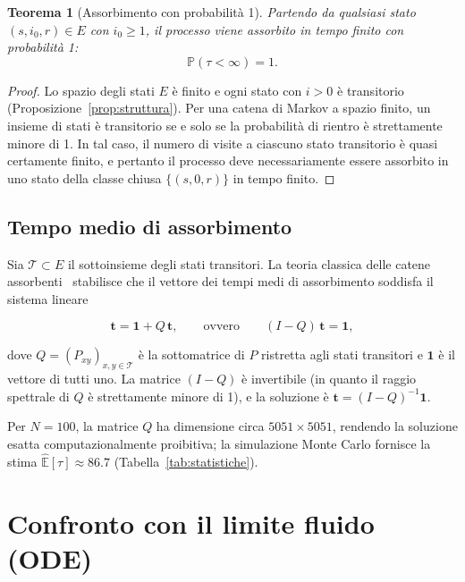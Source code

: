 \documentclass[11pt, a4paper]{article}
\theoremstyle{plain}
\newtheorem{theorem}{Teorema}[section]
\theoremstyle{definition}
\theoremstyle{remark}
\newcommand{\E}{\mathbb{E}}
\newcommand{\Prob}{\mathbb{P}}
\newcommand{\uno}{\mathbf{1}}
\begin{document}
\begin{theorem}[Assorbimento con probabilità 1]\label{thm:assorbimento}
  Partendo da qualsiasi stato $(s, i_0, r) \in E$ con $i_0 \geq 1$, il processo
  viene assorbito in tempo finito con probabilità 1:
  \[
    \Prob(\tau < \infty) = 1.
  \]
\end{theorem}

\begin{proof}
  Lo spazio degli stati $E$ è finito e ogni stato con $i > 0$ è transitorio
  (Proposizione~\ref{prop:struttura}). Per una catena di Markov a spazio finito,
  un insieme di stati è transitorio se e solo se la probabilità di rientro è
  strettamente minore di 1. In tal caso, il numero di visite a ciascuno stato
  transitorio è quasi certamente finito, e pertanto il processo deve necessariamente
  essere assorbito in uno stato della classe chiusa $\{(s,0,r)\}$ in tempo finito.
\end{proof}

\subsection{Tempo medio di assorbimento}

Sia $\mathcal{T} \subset E$ il sottoinsieme degli stati transitori. La teoria classica
delle catene assorbenti~\cite{norris1997} stabilisce che il vettore dei tempi medi di
assorbimento soddisfa il sistema lineare

\begin{equation}\label{eq:tempo_medio}
  \mathbf{t} = \uno + Q\,\mathbf{t},
  \qquad \text{ovvero} \qquad
  (I - Q)\,\mathbf{t} = \uno,
\end{equation}

dove $Q = (P_{xy})_{x,y \in \mathcal{T}}$ è la sottomatrice di $P$ ristretta agli
stati transitori e $\uno$ è il vettore di tutti uno. La matrice $(I - Q)$ è
invertibile (in quanto il raggio spettrale di $Q$ è strettamente minore di 1),
e la soluzione è $\mathbf{t} = (I-Q)^{-1}\uno$.

Per $N = 100$, la matrice $Q$ ha dimensione circa $5051 \times 5051$, rendendo
la soluzione esatta computazionalmente proibitiva; la simulazione Monte Carlo fornisce
la stima $\hat{\E}[\tau] \approx 86.7$ (Tabella~\ref{tab:statistiche}).

\section{Confronto con il limite fluido (ODE)}
\label{sec:limitefluido}
\end{document}
